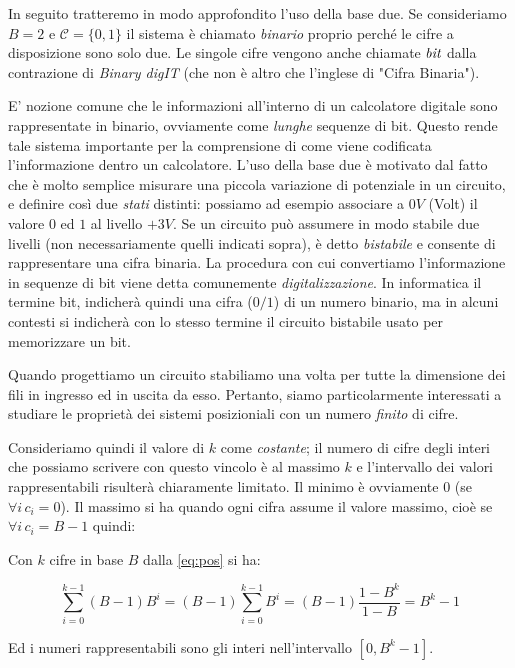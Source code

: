 In seguito tratteremo in modo approfondito l'uso della base due. Se consideriamo $B = 2$ e $\mathcal{C} = \{ 0, 1 \}$ il sistema è
chiamato \emph{binario} proprio perché le cifre a disposizione sono solo due.
Le singole cifre vengono anche chiamate $\emph{bit}$ dalla contrazione di
\emph{Binary digIT} (che non è altro che l'inglese di "Cifra
Binaria").

E' nozione comune che le informazioni all'interno di un calcolatore digitale
sono rappresentate in binario, ovviamente come \emph{lunghe} sequenze di bit.
Questo rende tale sistema importante per la comprensione di come viene
codificata l'informazione dentro un calcolatore. L'uso della base due è
motivato dal fatto che è molto semplice misurare una piccola variazione di
potenziale in un circuito, e definire così due \emph{stati} distinti: possiamo ad
esempio associare a $0V$ (Volt) il valore $0$ ed $1$ al livello $+3V$. Se un
circuito può assumere in modo stabile due livelli (non necessariamente quelli
indicati sopra), è detto \emph{bistabile} e consente di rappresentare una cifra
binaria. La procedura con cui convertiamo l'informazione in sequenze di bit
viene detta comunemente \emph{digitalizzazione}. In informatica il termine bit,
indicherà quindi una cifra ($0/1$) di un numero binario, ma in alcuni contesti
si indicherà con lo stesso termine il circuito bistabile usato per memorizzare
un bit.

Quando progettiamo un circuito stabiliamo una volta per tutte la dimensione
dei fili in ingresso ed in uscita da esso. Pertanto, siamo particolarmente
interessati a studiare le proprietà dei sistemi posizioniali con un numero
\emph{finito} di cifre.

Consideriamo quindi il valore di $k$ come \emph{costante}; il numero di cifre
degli interi che possiamo scrivere con questo vincolo è al massimo $k$ e
l'intervallo dei valori rappresentabili risulterà chiaramente limitato. Il
minimo è ovviamente $0$ (se $\forall i \, c_i = 0$). Il massimo si ha quando
ogni 
cifra assume il valore massimo, cioè se $\forall i\, c_i = B-1$ quindi:

\begin{observe} 
Con $k$ cifre in base $B$ dalla \eqref{eq:pos} si ha:

\begin{equation}\label{eq:range} \sum_{i=0}^{k-1} (B-1)B^i = (B-1)
\sum_{i=0}^{k-1} B^i = (B-1) \frac{1-B^k}{1-B} = B^k-1 \end{equation} 

Ed i numeri rappresentabili sono gli interi nell'intervallo $[0,B^k-1]$.
\end{observe}

